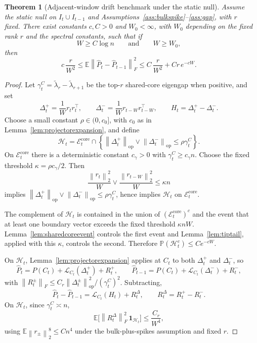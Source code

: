 \documentclass[11pt]{article}
\theoremstyle{tightplain}
\newtheorem{theorem}{Theorem}[section]
\theoremstyle{tightdef}
\DeclareMathOperator{\op}{op}
\newcommand{\E}{\mathbb E}
\newcommand{\Prob}{\mathbb P}
\newcommand{\norm}[1]{\left\lVert #1 \right\rVert}
\newcommand{\one}{\mathbf 1}
\begin{document}
\begin{theorem}[Adjacent-window drift benchmark under the static null]\label{thm:overlapbenchmark}
Assume the static null on $I_t\cup I_{t-1}$ and
Assumptions~\ref{ass:bulkspike}--\ref{ass:gap}, with $r$ fixed. There exist
constants $c,C>0$ and $W_0<\infty$, with $W_0$ depending on the fixed rank $r$
and the spectral constants, such that if
\[
W\ge C\log n
\qquad
\text{and}
\qquad
W\ge W_0,
\]
then
\[
c\,\frac r{W^2}
\le
\E\norm{\widehat P_t-\widehat P_{t-1}}_F^2
\le
C\,\frac r{W^2}+C r\, e^{-cW}.
\]
\end{theorem}

\begin{proof}
Let $\gamma_t^C=\widetilde\lambda_r-\widetilde\lambda_{r+1}$ be the top-$r$
shared-core eigengap when positive, and set
\[
\Delta_t^+=\frac1W r_t r_t^\top,
\qquad
\Delta_t^-=\frac1W r_{t-W} r_{t-W}^\top,
\qquad
H_t=\Delta_t^+-\Delta_t^-.
\]
Choose a small constant $\rho\in(0,c_0]$, with $c_0$ as in
Lemma~\ref{lem:projectorexpansion}, and define
\[
\mathcal H_t
=\mathcal E_t^{\mathrm{core}}
\cap
\left\{
\norm{\Delta_t^+}_{\op}\vee\norm{\Delta_t^-}_{\op}
\le
\rho\gamma_t^C
\right\}.
\]
On $\mathcal E_t^{\mathrm{core}}$ there is a deterministic constant $c_\gamma>0$
with $\gamma_t^C\ge c_\gamma n$. Choose the fixed threshold
$\kappa=\rho c_\gamma/2$. Then
\[
\frac{\norm{r_t}_2^2}{W}
\vee
\frac{\norm{r_{t-W}}_2^2}{W}
\le
\kappa n
\]
implies $\norm{\Delta_t^+}_{\op}\vee\norm{\Delta_t^-}_{\op}\le\rho\gamma_t^C$,
hence implies $\mathcal H_t$ on $\mathcal E_t^{\mathrm{core}}$.

The complement of $\mathcal H_t$ is contained in the union of
$(\mathcal E_t^{\mathrm{core}})^c$ and the event that at least one boundary
vector exceeds the fixed threshold $\kappa nW$.
Lemma~\ref{lem:sharedcoreevent} controls the first event and
Lemma~\ref{lem:tiptail}, applied with this $\kappa$, controls the second.
Therefore $\Prob(\mathcal H_t^c)\le Ce^{-cW}$.

On $\mathcal H_t$, Lemma~\ref{lem:projectorexpansion} applies at $C_t$ to both
$\Delta_t^+$ and $\Delta_t^-$, so
\[
\widehat P_t
=P(C_t)+\mathcal L_{C_t}(\Delta_t^+)+R_t^+,
\qquad
\widehat P_{t-1}
=P(C_t)+\mathcal L_{C_t}(\Delta_t^-)+R_t^-,
\]
with $\norm{R_t^\pm}_F\le C_r\norm{\Delta_t^\pm}_{\op}^2/(\gamma_t^C)^2$.
Subtracting,
\[
\widehat P_t-\widehat P_{t-1}
=\mathcal L_{C_t}(H_t)+R_t^\Delta,
\qquad
R_t^\Delta=R_t^+-R_t^-.
\]
On $\mathcal H_t$, since $\gamma_t^C\asymp n$,
\[
\E\bigl[\norm{R_t^\Delta}_F^2\,\one_{\mathcal H_t}\bigr]\le \frac{C_r}{W^4},
\]
using $\E\norm{r_\pm}_2^8\le Cn^4$ under the bulk-plus-spikes assumption and
fixed $r$.


\end{proof}
\end{document}
